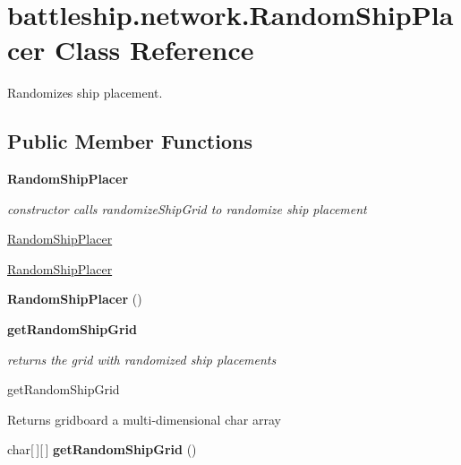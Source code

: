 \hypertarget{classbattleship_1_1network_1_1RandomShipPlacer}{}\section{battleship.\+network.\+Random\+Ship\+Placer Class Reference}
\label{classbattleship_1_1network_1_1RandomShipPlacer}


Randomizes ship placement.  


\subsection*{Public Member Functions}
\begin{Indent}{\bf Random\+Ship\+Placer}\par
{\em constructor calls randomize\+Ship\+Grid to randomize ship placement

\hyperlink{classbattleship_1_1network_1_1RandomShipPlacer}{Random\+Ship\+Placer}

\hyperlink{classbattleship_1_1network_1_1RandomShipPlacer}{Random\+Ship\+Placer} }\begin{DoxyCompactItemize}
\item 
\hypertarget{classbattleship_1_1network_1_1RandomShipPlacer_a29bdfa2a2080b1fb7d87a4105b1ea4da}{}{\bfseries Random\+Ship\+Placer} ()\label{classbattleship_1_1network_1_1RandomShipPlacer_a29bdfa2a2080b1fb7d87a4105b1ea4da}

\end{DoxyCompactItemize}
\end{Indent}
\begin{Indent}{\bf get\+Random\+Ship\+Grid}\par
{\em returns the grid with randomized ship placements

get\+Random\+Ship\+Grid

\begin{DoxyReturn}{Returns}
gridboard a multi-\/dimensional char array 
\end{DoxyReturn}
}\begin{DoxyCompactItemize}
\item 
\hypertarget{classbattleship_1_1network_1_1RandomShipPlacer_aacc59540fb3e744f0f3e80fbe4ea4e90}{}char\mbox{[}$\,$\mbox{]}\mbox{[}$\,$\mbox{]} {\bfseries get\+Random\+Ship\+Grid} ()\label{classbattleship_1_1network_1_1RandomShipPlacer_aacc59540fb3e744f0f3e80fbe4ea4e90}

\end{DoxyCompactItemize}
\end{Indent}

